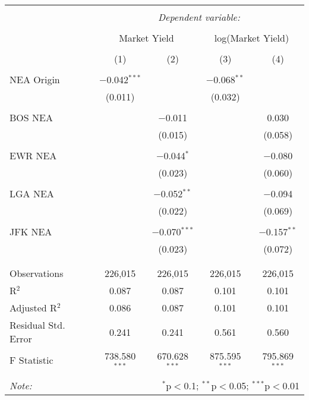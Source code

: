 
\begin{tabular}{@{\extracolsep{5pt}}lcccc} 
\\[-1.8ex]\hline 
\hline \\[-1.8ex] 
 & \multicolumn{4}{c}{\textit{Dependent variable:}} \\ 
\cline{2-5} 
\\[-1.8ex] & \multicolumn{2}{c}{Market Yield} & \multicolumn{2}{c}{log(Market Yield)} \\ 
\\[-1.8ex] & (1) & (2) & (3) & (4)\\ 
\hline \\[-1.8ex] 
 NEA Origin & $-$0.042$^{***}$ &  & $-$0.068$^{**}$ &  \\ 
  & (0.011) &  & (0.032) &  \\ 
  & & & & \\ 
 BOS NEA &  & $-$0.011 &  & 0.030 \\ 
  &  & (0.015) &  & (0.058) \\ 
  & & & & \\ 
 EWR NEA &  & $-$0.044$^{*}$ &  & $-$0.080 \\ 
  &  & (0.023) &  & (0.060) \\ 
  & & & & \\ 
 LGA NEA &  & $-$0.052$^{**}$ &  & $-$0.094 \\ 
  &  & (0.022) &  & (0.069) \\ 
  & & & & \\ 
 JFK NEA &  & $-$0.070$^{***}$ &  & $-$0.157$^{**}$ \\ 
  &  & (0.023) &  & (0.072) \\ 
  & & & & \\ 
\hline \\[-1.8ex] 
Observations & 226,015 & 226,015 & 226,015 & 226,015 \\ 
R$^{2}$ & 0.087 & 0.087 & 0.101 & 0.101 \\ 
Adjusted R$^{2}$ & 0.086 & 0.087 & 0.101 & 0.101 \\ 
Residual Std. Error & 0.241 & 0.241 & 0.561 & 0.560 \\ 
F Statistic & 738.580$^{***}$ & 670.628$^{***}$ & 875.595$^{***}$ & 795.869$^{***}$ \\ 
\hline 
\hline \\[-1.8ex] 
\textit{Note:}  & \multicolumn{4}{r}{$^{*}$p$<$0.1; $^{**}$p$<$0.05; $^{***}$p$<$0.01} \\ 
\end{tabular} 
